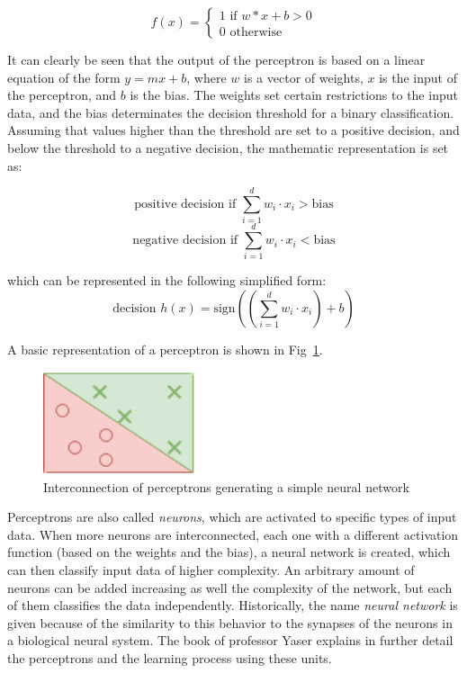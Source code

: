 \begin{equation}
    f(x) =
    \begin{cases}
        1 \text{ if } w*x + b > 0\\
        0 \text{ otherwise}
    \end{cases}
\end{equation}

It can clearly be seen that the output of the perceptron is based on a linear equation of the form \(y=mx+b\), where \(w\) is a vector of weights, \(x\) is the input of the perceptron, and \(b\) is the bias. The weights set certain restrictions to the input data, and the bias determinates the decision threshold for a binary classification. Assuming that values higher than the threshold are set to a positive decision, and below the threshold to a negative decision, the mathematic representation is set as:

\begin{equation}
    \text{positive decision if } \sum_{i=1}^{d} w_i\cdot x_i > \text{bias}
\end{equation}
\begin{equation}
    \text{negative decision if } \sum_{i=1}^{d} w_i\cdot x_i < \text{bias}
\end{equation}

which can be represented in the following simplified form:
\begin{equation}
    \text{decision } h(x) = \text{sign}\left(  \left( \sum_{i=1}^{d} w_i\cdot x_i \right )+ b \right )
\end{equation}

A basic representation of a perceptron is shown in Fig~\ref{fig:perceptron}.

\begin{figure}[!htb]
    \centering
      \includegraphics[width=0.4\textwidth]{figures/perceptron}
      \caption{Interconnection of perceptrons generating a simple neural network}
      \label{fig:perceptron}
\end{figure}

Perceptrons are also called \emph{neurons}, which are activated to specific types of input data. When more neurons are interconnected, each one with a different activation function (based on the weights and the bias), a neural network is created, which can then classify input data of higher complexity. An arbitrary amount of neurons can be added increasing as well the complexity of the network, but each of them classifies the data independently. Historically, the name \emph{neural network} is given because of the similarity to this behavior to the synapses of the neurons in a biological neural system. The book of professor Yaser \cite{Yaser} explains in further detail the perceptrons and the learning process using these units.

